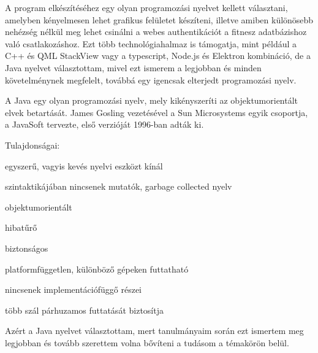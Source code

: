 A program elkészítéséhez egy olyan programozási nyelvet kellett választani, amelyben kényelmesen lehet grafikus felületet készíteni, illetve amiben különösebb nehézség nélkül meg lehet csinálni a webes authentikációt a fitnesz adatbázishoz való csatlakozáshoz. Ezt több technológiahalmaz is támogatja, mint például a C++ és QML StackView vagy a typescript, Node.js és Elektron kombináció, de a Java nyelvet választottam, mivel ezt ismerem a legjobban és minden követelménynek megfelelt, továbbá egy igencsak elterjedt programozási nyelv. 

A Java egy olyan programozási nyelv, mely kikényszeríti az objektumorientált elvek betartását. James Gosling vezetésével a Sun Microsystems egyik csoportja, a JavaSoft tervezte, első verzióját 1996-ban adták ki. 

Tulajdonságai: 

egyszerű, vagyis kevés nyelvi eszközt kínál 

szintaktikájában nincsenek mutatók, garbage collected nyelv 

objektumorientált 

hibatűrő 

biztonságos 

platformfüggetlen, különböző gépeken futtatható 

nincsenek implementációfüggő részei 

több szál párhuzamos futtatását biztosítja 

Azért a Java nyelvet választottam, mert tanulmányaim során ezt ismertem meg legjobban és tovább szerettem volna bővíteni a tudásom a témakörön belül. 